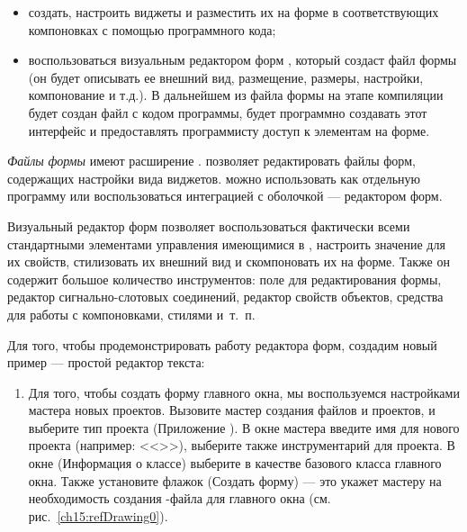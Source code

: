 \begin{itemize}
\item создать, настроить виджеты и разместить их на форме в соответствующих компоновках с помощью программного кода;
\item воспользоваться визуальным редактором форм , который создаст файл формы (он будет описывать ее внешний
вид, размещение, размеры, настройки, компонование и т.д.). В дальнейшем из файла формы на этапе компиляции будет создан
файл с кодом программы, будет программно создавать этот интерфейс и предоставлять программисту доступ к элементам на
форме.
\end{itemize}
\emph{Файлы }\emph{формы} имеют расширение .  позволяет
редактировать файлы форм, содержащих настройки вида виджетов.  можно использовать как отдельную программу
или воспользоваться интеграцией с оболочкой  --- редактором форм.

Визуальный редактор форм позволяет воспользоваться фактически всеми стандартными элементами
управления имеющимися в , настроить значение для их свойств, стилизовать их внешний вид и скомпоновать их на форме.
Также он содержит большое количество инструментов: поле для редактирования формы, редактор сигнально-слотовых
соединений, редактор свойств объектов, средства для работы с компоновками, стилями и~т.~п.

Для того, чтобы продемонстрировать работу редактора форм, создадим новый пример --- простой редактор текста:

\begin{enumerate}
\item Для того, чтобы создать форму главного окна, мы воспользуемся настройками мастера новых проектов. Вызовите мастер
создания файлов и проектов, и выберите тип проекта (Приложение ). 
В окне мастера
введите имя для нового проекта (например: <<>>), выберите также
инструментарий для проекта. В окне  (Информация о классе) выберите
 в качестве базового класса главного окна. Также установите флажок 
(Создать форму) --- это укажет мастеру на необходимость
создания -файла для главного окна (см. рис.~\ref{ch15:refDrawing0}).
\end{enumerate}

